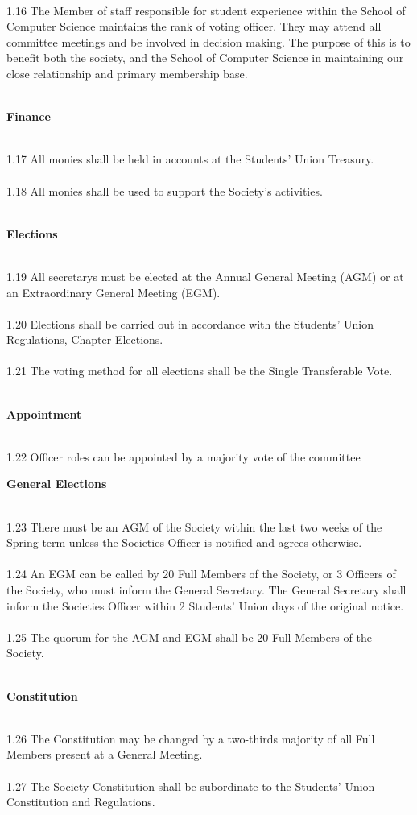 \documentclass[a4paper,twoside,notitlepage,11pt]{article}
\newcommand{\consHead}[1]{\begin{Large}\textbf{#1}\end{Large}\ \\}
\begin{document}
\ \\
1.16 The Member of staff responsible for student experience within the School of Computer Science maintains the rank of voting officer. They may attend all committee meetings and be involved in decision making. The purpose of this is to benefit both the society, and the School of Computer Science in maintaining our close relationship and primary membership base.\ \\
\ \\
\consHead{Finance}
1.17 All monies shall be held in accounts at the Students' Union Treasury.\ \\
\ \\
1.18 All monies shall be used to support the Society's activities.\ \\
\ \\
\consHead{Elections}
1.19 All secretarys must be elected at the Annual General Meeting (AGM) or at an Extraordinary General Meeting (EGM).\ \\
\ \\
1.20 Elections shall be carried out in accordance with the Students' Union Regulations, Chapter Elections.\ \\
\ \\
1.21 The voting method for all elections shall be the Single Transferable Vote.\ \\
\ \\
\consHead{Appointment}
1.22 Officer roles can be appointed by a majority vote of the committee
\ \\
\consHead{General Elections}
1.23 There must be an AGM of the Society within the last two weeks of the Spring term unless the Societies Officer is notified and agrees otherwise.\ \\
\ \\
1.24 An EGM can be called by 20 Full Members of the Society, or 3 Officers of the Society, who must inform the General Secretary. The General Secretary shall inform the Societies Officer within 2 Students' Union days of the original notice.\ \\
\ \\
1.25 The quorum for the AGM and EGM shall be 20 Full Members of the Society. 
\ \\
\ \\
\consHead{Constitution}
1.26	The Constitution may be changed by a two-thirds majority of all Full Members present at a General Meeting.\ \\
\ \\
1.27 The Society Constitution shall be subordinate to the Students' Union Constitution and Regulations.
\end{document}
